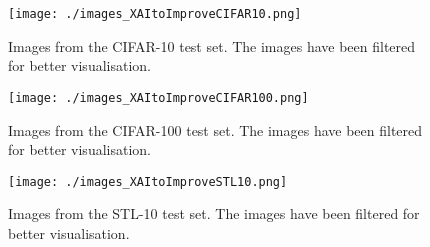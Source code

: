 \begin{figure}[h!]
\centering
    \centering
    \texttt{[image: ./images\_XAItoImproveCIFAR10.png]}
\caption{Images from the CIFAR-10 test set. The images have been filtered for better visualisation.
} 
\label{images_CIFAR10}
\end{figure}

\begin{figure}[h!]
\centering
    \centering
    \texttt{[image: ./images\_XAItoImproveCIFAR100.png]}
\caption{Images from the CIFAR-100 test set. The images have been filtered for better visualisation.} 
\label{images_CIFAR100}
\end{figure}

\begin{figure}[h!]
\centering
    \centering
    \texttt{[image: ./images\_XAItoImproveSTL10.png]}
\caption{Images from the STL-10 test set. The images have been filtered for better visualisation.} 
\label{images_STL10} 
\end{figure}